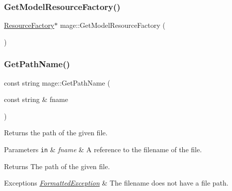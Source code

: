 \hypertarget{namespacemage_a9e1af7d81b6fc43a327bbe5df092dc0c}{}\label{namespacemage_a9e1af7d81b6fc43a327bbe5df092dc0c} 
\subsubsection{\texorpdfstring{Get\+Model\+Resource\+Factory()}{GetModelResourceFactory()}}
{\footnotesize\ttfamily \hyperlink{classmage_1_1_resource_factory}{Resource\+Factory}$\ast$ mage\+::\+Get\+Model\+Resource\+Factory (\begin{DoxyParamCaption}{ }\end{DoxyParamCaption})\hspace{0.3cm}{\ttfamily [noexcept]}}

\hypertarget{namespacemage_ab3642c6ef6cf94a62fb37b40c3c2f57e}{}\label{namespacemage_ab3642c6ef6cf94a62fb37b40c3c2f57e} 
\subsubsection{\texorpdfstring{Get\+Path\+Name()}{GetPathName()}\hspace{0.1cm}{\footnotesize\ttfamily [1/2]}}
{\footnotesize\ttfamily const string mage\+::\+Get\+Path\+Name (\begin{DoxyParamCaption}\item[{const string \&}]{fname }\end{DoxyParamCaption})}

Returns the path of the given file.


\begin{DoxyParams}[1]{Parameters}
\mbox{\tt in}  & {\em fname} & A reference to the filename of the file. \\
\hline
\end{DoxyParams}
\begin{DoxyReturn}{Returns}
The path of the given file. 
\end{DoxyReturn}

\begin{DoxyExceptions}{Exceptions}
{\em \hyperlink{structmage_1_1_formatted_exception}{Formatted\+Exception}} & The filename does not have a file path. \\
\hline
\end{DoxyExceptions}
\hypertarget{namespacemage_ad23faa6d1854d389eb37fbdeefe97361}{}\label{namespacemage_ad23faa6d1854d389eb37fbdeefe97361} 
